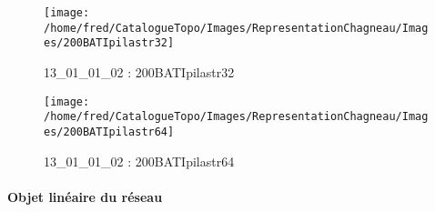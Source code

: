 \documentclass[12pt,titlepage,oneside]{book}
\begin{document}
\begin{figure}[h!]
\begin{minipage}[t]{3cm}
    \begin{center}
      \texttt{[image: /home/fred/CatalogueTopo/Images/RepresentationChagneau/Images/200BATIpilastr32]}
      \caption[200BATIpilastr32]{\label{} 13\_01\_01\_02 : 200BATIpilastr32}
    \end{center}
  \end{minipage}
  \begin{minipage}[t]{3cm}
    \begin{center}
      \texttt{[image: /home/fred/CatalogueTopo/Images/RepresentationChagneau/Images/200BATIpilastr64]}
      \caption[200BATIpilastr64]{\label{} 13\_01\_01\_02 : 200BATIpilastr64}
    \end{center}
  \end{minipage}
\end{figure}


\paragraph{Objet linéaire du réseau}
\noindent
\vspace{\baselineskip}
\end{document}
